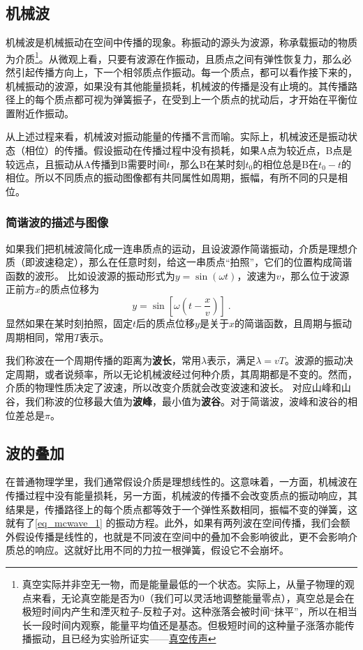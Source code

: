 
\subsection{机械波}
机械波是机械振动在空间中传播的现象。称振动的源头为波源，称承载振动的物质为介质\footnote{真空实际并非空无一物，而是能量最低的一个状态。实际上，从量子物理的观点来看，无论真空能是否为0（我们可以灵活地调整能量零点），真空总是会在极短时间内产生和湮灭粒子-反粒子对。这种涨落会被时间“抹平”，所以在相当长一段时间内观察，能量平均值还是基态。但极短时间的这种量子涨落亦能传播振动，且已经为实验所证实——\href{https://www.rmzxw.com.cn/c/2023-08-25/3399291.shtml}{真空传声}}。从微观上看，只要有波源在作振动，且质点之间有弹性恢复力，那么必然引起传播方向上，下一个相邻质点作振动。每一个质点，都可以看作接下来的，机械振动的波源，如果没有其他能量损耗，机械波的传播是没有止境的。其传播路径上的每个质点都可视为弹簧振子，在受到上一个质点的扰动后，才开始在平衡位置附近作振动。

从上述过程来看，机械波对振动能量的传播不言而喻。实际上，机械波还是振动状态（相位）的传播。假设振动在传播过程中没有损耗，如果A点为较近点，B点是较远点，且振动从A传播到B需要时间$t$，那么B在某时刻$t_0$的相位总是B在$t_0-t$的相位。所以不同质点的振动图像都有共同属性如周期，振幅，有所不同的只是相位。
\subsubsection{简谐波的描述与图像}
如果我们把机械波简化成一连串质点的运动，且设波源作简谐振动，介质是理想介质（即波速稳定），那么在任意时刻，给这一串质点“拍照”，它们的位置构成简谐函数的波形。
比如设波源的振动形式为$y=\sin(\omega t)$，波速为$v$，那么位于波源正前方$x$的质点位移为
\begin{equation}\label{eq_mcwave_1}
y=\sin [\omega (t-\frac{x}{v})]~.
\end{equation}
显然如果在某时刻拍照，固定$t$后的质点位移$y$是关于$x$的简谐函数，且周期与振动周期相同，常用$T$表示。%

我们称波在一个周期传播的距离为\textbf{波长}，常用$\lambda $表示，满足$\lambda=vT$。波源的振动决定周期，或者说频率，所以无论机械波经过何种介质，其周期都是不变的。然而，介质的物理性质决定了波速，所以改变介质就会改变波速和波长。
对应山峰和山谷，我们称波的位移最大值为\textbf{波峰}，最小值为\textbf{波谷}。对于简谐波，波峰和波谷的相位差总是$\pi$。

\subsection{波的叠加}
在普通物理学里，我们通常假设介质是理想线性的。这意味着，一方面，机械波在传播过程中没有能量损耗，另一方面，机械波的传播不会改变质点的振动响应，其结果是，传播路径上的每个质点都等效于一个弹性系数相同，振幅不变的弹簧，这就有了\autoref{eq_mcwave_1} 的振动方程。此外，如果有两列波在空间传播，我们会额外假设传播是线性的，也就是不同波在空间中的叠加不会影响彼此，更不会影响介质总的响应。这就好比用不同的力拉一根弹簧，假设它不会崩坏。

